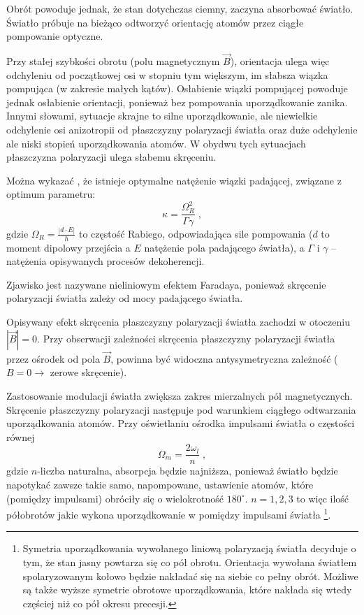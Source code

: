 \documentclass[a4paper,10pt,twoside]{article}
\begin{document}
Obrót powoduje jednak, że stan dotychczas ciemny, zaczyna absorbować światło. Światło próbuje na bieżąco odtworzyć orientację atomów przez ciągłe pompowanie optyczne.

Przy stałej szybkości obrotu (polu magnetycznym $\vec B$), orientacja ulega więc odchyleniu od początkowej osi w stopniu tym większym, im słabsza wiązka pompująca (w zakresie małych kątów). Osłabienie wiązki pompującej powoduje jednak osłabienie orientacji, ponieważ bez pompowania uporządkowanie zanika. Innymi słowami, sytuacje skrajne to silne uporządkowanie, ale niewielkie odchylenie osi anizotropii od płaszczyzny polaryzacji światła oraz duże odchylenie ale niski stopień uporządkowania atomów. W obydwu tych sytuacjach płaszczyzna polaryzacji ulega słabemu skręceniu.

Można wykazać \cite{srivansan}, że istnieje optymalne natężenie wiązki padającej, związane z optimum parametru:
\begin{equation}
\kappa=\frac{\Omega_R^2}{\Gamma\gamma} \; ,
\end{equation}
gdzie $\Omega_R=\frac{|d \cdot E|}{\hbar}$ to częstość Rabiego, odpowiadająca sile pompowania ($d$ to moment dipolowy przejścia a $E$ natężenie pola padającego światła), a $\Gamma$ i $\gamma$ -- natężenia opisywanych procesów dekoherencji.

Zjawisko jest nazywane nieliniowym efektem Faradaya, ponieważ skręcenie polaryzacji światła zależy od mocy padającego światła.

Opisywany efekt skręcenia płaszczyzny polaryzacji światła zachodzi w otoczeniu $|\vec B|=0$. Przy obserwacji zależności skręcenia płaszczyzny polaryzacji światła przez ośrodek od pola $\vec B$, powinna być widoczna antysymetryczna zależność ($B=0\rightarrow$ zerowe skręcenie).

 Zastosowanie modulacji światła zwiększa zakres mierzalnych pól magnetycznych. Skręcenie płaszczyzny polaryzacji następuje pod warunkiem ciągłego odtwarzania uporządkowania atomów. Przy oświetlaniu ośrodka impulsami światła o częstości równej
\begin{equation}
\Omega_m=\frac{2 \omega_l}{n} \; ,
\end{equation}
gdzie $n$-liczba naturalna, absorpcja będzie najniższa, ponieważ światło będzie napotykać zawsze takie samo, napompowane, ustawienie atomów, które (pomiędzy impulsami) obróciły się o wielokrotność $180^{\circ}$.  $n=1,2,3$ to więc ilość półobrotów jakie wykona uporządkowanie w pomiędzy impulsami światła \footnote{Symetria uporządkowania wywołanego liniową polaryzacją światła decyduje o tym, że stan jasny powtarza się co pół obrotu. Orientacja wywołana światłem spolaryzowanym kołowo będzie nakładać się na siebie co pełny obrót. Możliwe są także wyższe symetrie obrotowe uporządkowania, które nakłada się wtedy częściej niż co pół okresu precesji.}.
\end{document}
